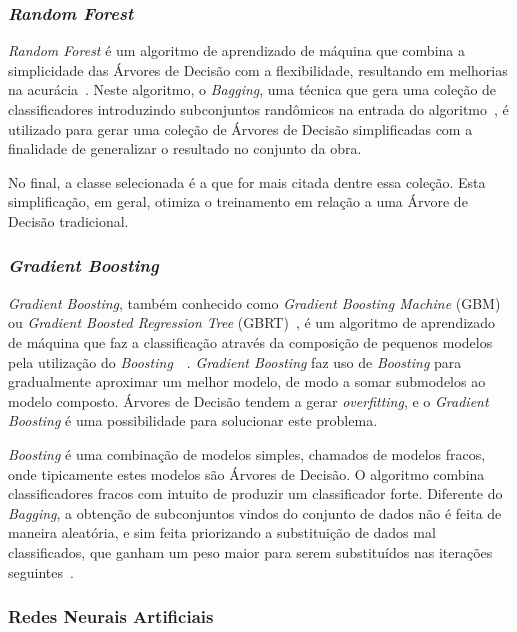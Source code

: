 \documentclass[portugues]{ic-tese}
\begin{document}
\subsubsection{\textit{Random Forest}}

\textit{Random Forest} é um algoritmo de aprendizado de máquina que combina a simplicidade das Árvores de Decisão com a flexibilidade, resultando em melhorias na acurácia~\citep{Breiman_2001}. Neste algoritmo, o \textit{Bagging}, uma técnica que gera uma coleção de classificadores introduzindo subconjuntos randômicos na entrada do algoritmo~\citep{Witten_2016}, é utilizado para gerar uma coleção de Árvores de Decisão simplificadas com a finalidade de generalizar o resultado no conjunto da obra.

No final, a classe selecionada é a que for mais citada dentre essa coleção. Esta simplificação, em geral, otimiza o treinamento em relação a uma Árvore de Decisão tradicional.

\subsubsection{\textit{Gradient Boosting}}

\textit{Gradient Boosting}, também conhecido como \textit{Gradient Boosting Machine} (GBM) ou \textit{Gradient Boosted Regression Tree} (GBRT)~\citep{Chen_2016}, é um algoritmo de aprendizado de máquina que faz a classificação através da composição de pequenos modelos pela utilização do \textit{Boosting}~\citep{Friedman_2000}~\citep{Hastie_2009}. \textit{Gradient Boosting} faz uso de \textit{Boosting} para gradualmente aproximar um melhor modelo, de modo a somar submodelos ao modelo composto. Árvores de Decisão tendem a gerar \textit{overfitting}, e o \textit{Gradient Boosting} é uma possibilidade para solucionar este problema.

\textit{Boosting} é uma combinação de modelos simples, chamados de modelos fracos, onde tipicamente estes modelos são Árvores de Decisão. O algoritmo combina classificadores fracos com intuito de produzir um classificador forte. Diferente do \textit{Bagging}, a obtenção de subconjuntos vindos do conjunto de dados não é feita de maneira aleatória, e sim feita priorizando a substituição de dados mal classificados, que ganham um peso maior para serem substituídos nas iterações seguintes~\citep{Hastie_2009}.

\subsubsection{Redes Neurais Artificiais}
\end{document}
